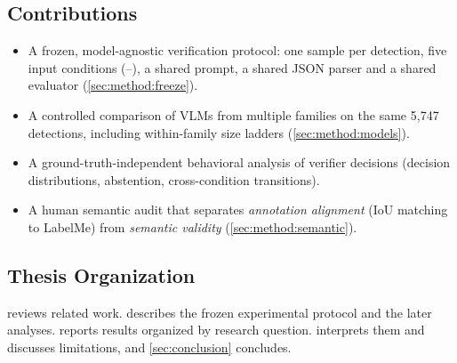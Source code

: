 \subsection{Contributions}
\begin{itemize}
  \item A frozen, model-agnostic verification protocol: one sample per
    detection, five input conditions (--), a shared prompt,
    a shared JSON parser and a shared evaluator
    (\cref{sec:method:freeze}).
  \item A controlled comparison of VLMs from multiple families on the same
    5{,}747 detections, including within-family size ladders
    (\cref{sec:method:models}). 
  \item A ground-truth-independent behavioral analysis of verifier decisions
    (decision distributions, abstention, cross-condition transitions).
  \item A human semantic audit that separates \emph{annotation alignment}
    (IoU matching to LabelMe) from \emph{semantic validity}
    (\cref{sec:method:semantic}).
\end{itemize}

\subsection{Thesis Organization}
 reviews related work.  describes the
frozen experimental protocol and the later analyses. 
reports results organized by research question. 
interprets them and discusses limitations, and \cref{sec:conclusion}
concludes.
